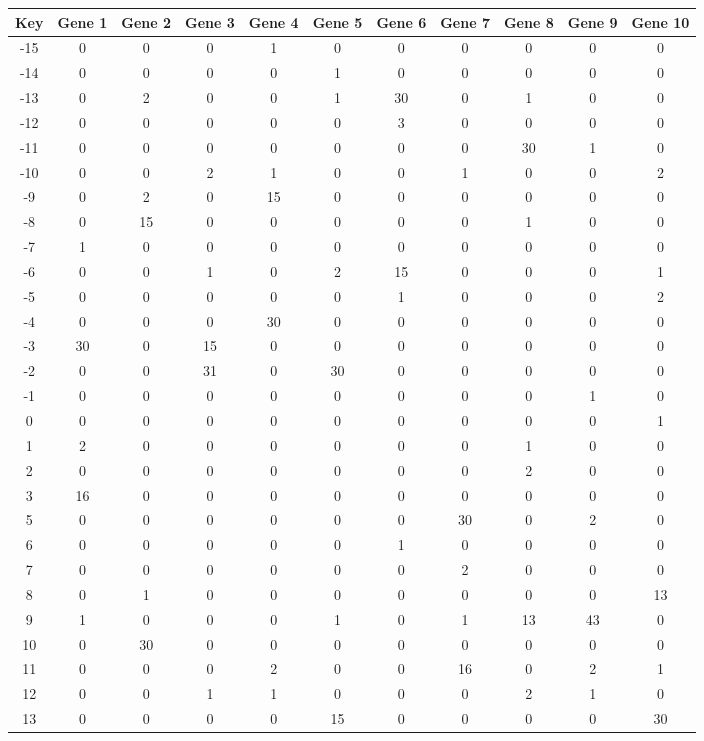 \begin{tabular}{|c|c|c|c|c|c|c|c|c|c|c|}
\hline
Key & Gene 1 & Gene 2 & Gene 3 & Gene 4 & Gene 5 & Gene 6 & Gene 7 & Gene 8 & Gene 9 & Gene 10 \\
\hline
-15 & 0 & 0 & 0 & 1 & 0 & 0 & 0 & 0 & 0 & 0 \\
-14 & 0 & 0 & 0 & 0 & 1 & 0 & 0 & 0 & 0 & 0 \\
-13 & 0 & 2 & 0 & 0 & 1 & 30 & 0 & 1 & 0 & 0 \\
-12 & 0 & 0 & 0 & 0 & 0 & 3 & 0 & 0 & 0 & 0 \\
-11 & 0 & 0 & 0 & 0 & 0 & 0 & 0 & 30 & 1 & 0 \\
-10 & 0 & 0 & 2 & 1 & 0 & 0 & 1 & 0 & 0 & 2 \\
-9 & 0 & 2 & 0 & 15 & 0 & 0 & 0 & 0 & 0 & 0 \\
-8 & 0 & 15 & 0 & 0 & 0 & 0 & 0 & 1 & 0 & 0 \\
-7 & 1 & 0 & 0 & 0 & 0 & 0 & 0 & 0 & 0 & 0 \\
-6 & 0 & 0 & 1 & 0 & 2 & 15 & 0 & 0 & 0 & 1 \\
-5 & 0 & 0 & 0 & 0 & 0 & 1 & 0 & 0 & 0 & 2 \\
-4 & 0 & 0 & 0 & 30 & 0 & 0 & 0 & 0 & 0 & 0 \\
-3 & 30 & 0 & 15 & 0 & 0 & 0 & 0 & 0 & 0 & 0 \\
-2 & 0 & 0 & 31 & 0 & 30 & 0 & 0 & 0 & 0 & 0 \\
-1 & 0 & 0 & 0 & 0 & 0 & 0 & 0 & 0 & 1 & 0 \\
0 & 0 & 0 & 0 & 0 & 0 & 0 & 0 & 0 & 0 & 1 \\
1 & 2 & 0 & 0 & 0 & 0 & 0 & 0 & 1 & 0 & 0 \\
2 & 0 & 0 & 0 & 0 & 0 & 0 & 0 & 2 & 0 & 0 \\
3 & 16 & 0 & 0 & 0 & 0 & 0 & 0 & 0 & 0 & 0 \\
5 & 0 & 0 & 0 & 0 & 0 & 0 & 30 & 0 & 2 & 0 \\
6 & 0 & 0 & 0 & 0 & 0 & 1 & 0 & 0 & 0 & 0 \\
7 & 0 & 0 & 0 & 0 & 0 & 0 & 2 & 0 & 0 & 0 \\
8 & 0 & 1 & 0 & 0 & 0 & 0 & 0 & 0 & 0 & 13 \\
9 & 1 & 0 & 0 & 0 & 1 & 0 & 1 & 13 & 43 & 0 \\
10 & 0 & 30 & 0 & 0 & 0 & 0 & 0 & 0 & 0 & 0 \\
11 & 0 & 0 & 0 & 2 & 0 & 0 & 16 & 0 & 2 & 1 \\
12 & 0 & 0 & 1 & 1 & 0 & 0 & 0 & 2 & 1 & 0 \\
13 & 0 & 0 & 0 & 0 & 15 & 0 & 0 & 0 & 0 & 30 \\
\hline
\end{tabular}